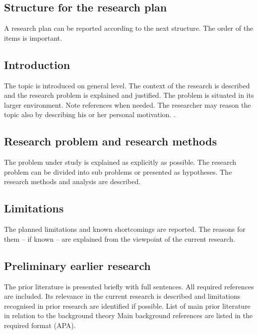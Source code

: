 \documentclass[a4paper,12pt]{article}
\begin{document}
\printbibliography[heading=bibintoc] %
\nocite{*}

\newpage
\begin{appendices}
	
	\section{Structure for the research plan}
	
	A research plan can be reported according to the next structure. The order of the items is 
	important.
	
	\begin{refsection}
		\subsection*{Introduction }
		The topic is introduced on general level. The context of the research is described and the 
		research  problem  is  explained  and  justified.  The  problem  is  situated  in  its  larger 
		environment. Note references when needed. The researcher may reason the topic also by 
		describing his or her personal motivation. \parencite{5418289}.
		\subsection*{Research problem and research methods }
		The problem under study is explained as explicitly as possible. The research problem 
		can be divided into sub problems or presented as hypotheses. The research methods and 
		analysis are described. 
		\subsection*{Limitations}
		The planned limitations and known shortcomings are reported. The reasons for them – if 
		known – are explained from the viewpoint of the current research.
		
		\subsection*{Preliminary earlier research}
		The prior literature is presented briefly with full sentences. All required references are 
		included. Its relevance in the current research is described and limitations recognised in 
		prior research are identified if possible. 
		List of main prior literature in relation to the background theory 
		Main background references are listed in the required format (APA).
		

\end{refsection}
\end{appendices}
\end{document}
